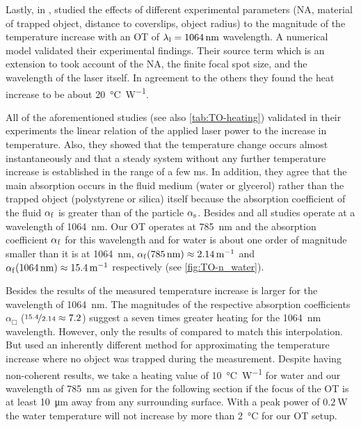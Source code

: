 Lastly, in \citeyear{Catala2017},  studied the effects of 
different experimental parameters (NA, material of trapped object, distance to 
coverslips, object radius) to the magnitude of the temperature increase with an 
OT of $\lal=\SI{1064}{\nm}$ wavelength. A numerical model validated their 
experimental findings. Their source term which is an extension to 
 took account of the NA, the finite focal spot size, and 
the wavelength of the laser itself. In agreement to the others they found the 
heat increase to be about \SI{20}{\degreeCelsius\per\watt}.

All of the aforementioned studies (see also \cref{tab:TO-heating}) validated in 
their experiments the linear relation of the applied laser power to the 
increase in temperature. Also, they showed that the temperature change occurs 
almost instantaneously and that a steady system without any further temperature 
increase is established in the range of a few \si{\ms}. In addition, they agree 
that the main absorption occurs in the fluid medium (water or glycerol) rather 
than the trapped object (polystyrene or silica) itself because the absorption 
coefficient of the fluid $\alpha_{\mathrm{f}}$ is greater than of the particle 
$\alpha_{\mathrm{s}}$. Besides  and  all 
studies operate at a wavelength of \SI{1064}{\nm}. Our OT operates at 
\SI{785}{\nm} and the absorption coefficient $\alpha_{\mathrm{f}}$ for this 
wavelength and for water is about one order of magnitude smaller than it is at 
\SI{1064}{\nm},
$\alpha_{\MR{f}}(\SI{785}{\nm}) \approx \SI{2.14}{\per\meter} $ and 
$\alpha_{\MR{f}}(\SI{1064}{\nm}) \approx \SI{15.4}{\per\meter} $ respectively 
(see \cref{fig:TO-n_water}).

Besides the results of  the measured temperature increase 
is larger for the wavelength of \SI{1064}{\nm}. The magnitudes of the 
respective absorption coefficients $\alpha_{\Box}$ 
($\nicefrac{15.4}{2.14}\approx 7.2$) suggest a seven times greater heating for 
the \SI{1064}{\nm} wavelength. However, only the results of 
 compared to  match this interpolation. 
But  used an inherently different method for approximating 
the temperature increase where no object was trapped during the measurement. 
Despite having non-coherent results, we take a heating value of 
\SI{10}{\degreeCelsius\per\watt} for water and our wavelength of \SI{785}{\nm} 
as given for the following section if the focus of the OT is at least 
\SI{10}{\um} away from any surrounding surface. With a peak power of 
$\SI{0.2}{\watt}$ the water temperature will not increase by more than 
\SI{2}{\degreeCelsius} for our OT setup.

